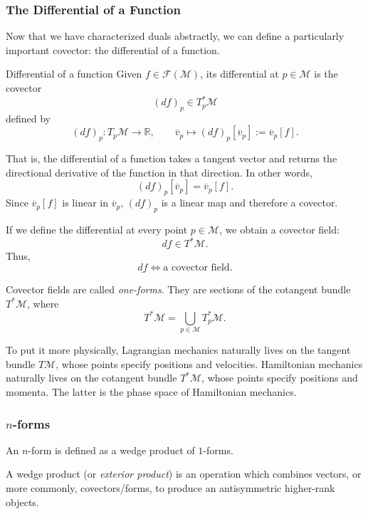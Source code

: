 	\subsubsection{The Differential of a Function}

		Now that we have characterized duals abstractly, we can define a particularly important covector: the differential of a function.

		\begin{definition}{Differential of a function}
			Given $f\in\mathcal F(\mathcal M)$, its differential at $p\in\mathcal M$ is the covector
			\[
				(\underline{df})_p\in T_p^*\mathcal M
			\]
			defined by
			\[
				(\underline{df})_p:T_p\mathcal M\to\mathbb R,
				\qquad
				\overline{v}_p\mapsto (\underline{df})_p[\overline{v}_p]:=\overline{v}_p[f].
			\]
		\end{definition}

		That is, the differential of a function takes a tangent vector and returns the directional derivative of the function in that direction. In other words,
		\[
			(\underline{df})_p[\overline{v}_p]=\overline{v}_p[f].
		\]
		Since $\overline{v}_p[f]$ is linear in $\overline v_p$, $(\underline{df})_p$ is a linear map and therefore a covector.

		If we define the differential at every point $p\in\mathcal M$, we obtain a covector field:
		\[
			\underline{df}\in T^*\mathcal M.
		\]
		Thus,
		\[
			\underline{df}\iff\text{a covector field}.
		\]

		Covector fields are called \textit{one-forms}. They are sections of the cotangent bundle $T^*\mathcal M$, where
		\[
			T^*\mathcal M
			=
			\bigcup_{p\in\mathcal M}T_p^*\mathcal M.
		\]

		To put it more physically, Lagrangian mechanics naturally lives on the tangent bundle $T\mathcal M$, whose points specify positions and velocities. Hamiltonian mechanics naturally lives on the cotangent bundle $T^*\mathcal M$, whose points specify positions and momenta. The latter is the phase space of Hamiltonian mechanics.

		\subsubsection{$n$-forms}

		An $n$-form is defined as a wedge product of $1$-forms. 

		A wedge product (or \textit{exterior product}) is an operation which
		combines vectors, or more commonly, covectors/forms, to produce an antisymmetric 
		higher-rank objects.


